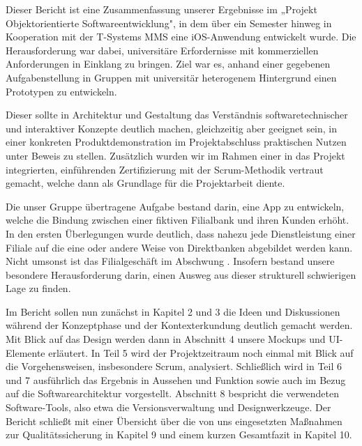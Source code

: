 	Dieser Bericht ist eine Zusammenfassung unserer Ergebnisse im „Projekt Objektorientierte Softwareentwicklung", in dem über ein Semester hinweg in Kooperation mit der T-Systems MMS eine iOS-Anwendung entwickelt wurde. Die Herausforderung war dabei, universitäre Erfordernisse mit kommerziellen Anforderungen in Einklang zu bringen. Ziel war es, anhand einer gegebenen Aufgabenstellung in Gruppen mit universitär heterogenem Hintergrund einen Prototypen zu entwickeln.
	
	Dieser sollte in Architektur und Gestaltung das Verständnis softwaretechnischer und interaktiver Konzepte deutlich machen, gleichzeitig aber geeignet sein, in einer konkreten Produktdemonstration im Projektabschluss praktischen Nutzen unter Beweis zu stellen. Zusätzlich wurden wir im Rahmen einer in das Projekt integrierten, einführenden Zertifizierung mit der Scrum-Methodik vertraut gemacht, welche dann als Grundlage für die Projektarbeit diente. 

	Die unser Gruppe übertragene Aufgabe bestand darin, eine App zu entwickeln, welche die Bindung zwischen einer fiktiven Filialbank und ihren Kunden erhöht. In den ersten Überlegungen wurde deutlich, dass nahezu jede Dienstleistung einer Filiale auf die eine oder andere Weise von Direktbanken abgebildet werden kann. Nicht umsonst ist das Filialgeschäft im Abschwung \citep{Welt14}. Insofern bestand unsere besondere Herausforderung darin, einen Ausweg aus dieser strukturell schwierigen Lage zu finden.
	
	Im Bericht sollen nun zunächst in Kapitel 2 und 3 die Ideen und Diskussionen während der Konzeptphase und der Kontexterkundung deutlich gemacht werden. Mit Blick auf das Design werden dann in Abschnitt 4 unsere Mockups und UI-Elemente erläutert. In Teil 5 wird der Projektzeitraum noch einmal mit Blick auf die Vorgehensweisen, insbesondere Scrum, analysiert. Schließlich wird in Teil 6 und 7 ausführlich das Ergebnis in Aussehen und Funktion sowie auch im Bezug auf die Softwarearchitektur vorgestellt. Abschnitt 8 bespricht die verwendeten Software-Tools, also etwa die Versionsverwaltung und Designwerkzeuge. Der Bericht schließt mit einer Übersicht über die von uns eingesetzten Maßnahmen zur Qualitätssicherung in Kapitel 9 und einem kurzen Gesamtfazit in Kapitel 10.
	 